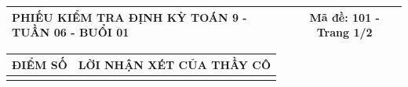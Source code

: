 \documentclass[12pt,a4paper]{article}
\begin{document}
\pagestyle{empty}

\noindent
\begin{tabularx}{\linewidth}{|X|c|}
\hline
\textbf{PHIẾU KIỂM TRA ĐỊNH KỲ TOÁN 9 - TUẦN 06 - BUỔI 01} & \textbf{Mã đề: 101 - Trang 1/2} \\
\hline
\end{tabularx}

\vspace{1.0mm}

\noindent
\begin{tabularx}{\linewidth}{|p{3.2cm}|X|}
\hline
\centering\textbf{ĐIỂM SỐ} & \centering\textbf{LỜI NHẬN XÉT CỦA THẦY CÔ} \tabularnewline
\hline
\rule{0pt}{1.8cm} & \tabularnewline
\hline
\end{tabularx}
\end{document}
